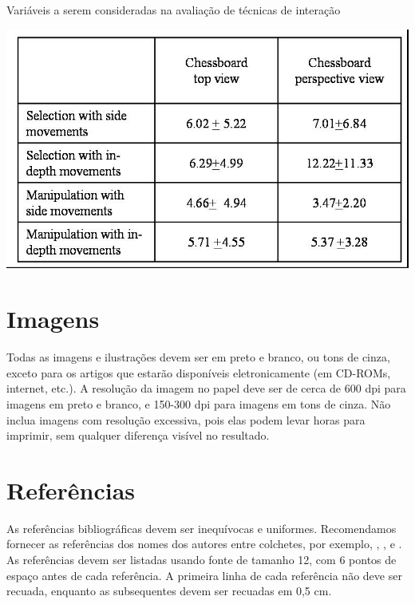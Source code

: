 \documentclass[12pt]{article}
\begin{document}
\begin{table}[ht]
\centering
\caption{Variáveis a serem consideradas na avaliação de técnicas de
interação}
\label{tab:exTable1}
\includegraphics[width=.7\textwidth]{table.jpg}
\end{table}

\section{Imagens}

Todas as imagens e ilustrações devem ser em preto e branco, ou tons de cinza,
exceto para os artigos que estarão disponíveis eletronicamente (em CD-ROMs,
internet, etc.). A resolução da imagem no papel deve ser de cerca de 600 dpi para
imagens em preto e branco, e 150-300 dpi para imagens em tons de cinza. Não inclua
imagens com resolução excessiva, pois elas podem levar horas para imprimir, sem qualquer
diferença visível no resultado.

\section{Referências}

As referências bibliográficas devem ser inequívocas e uniformes. Recomendamos fornecer
as referências dos nomes dos autores entre colchetes, por exemplo, \cite{knuth:84},
\cite{boulic:91}, e \cite{smith:99}. As referências devem ser listadas usando fonte de tamanho 12, com 6 pontos de espaço
antes de cada referência. A primeira linha de cada referência não deve ser
recuada, enquanto as subsequentes devem ser recuadas em 0,5 cm.



\end{document}
